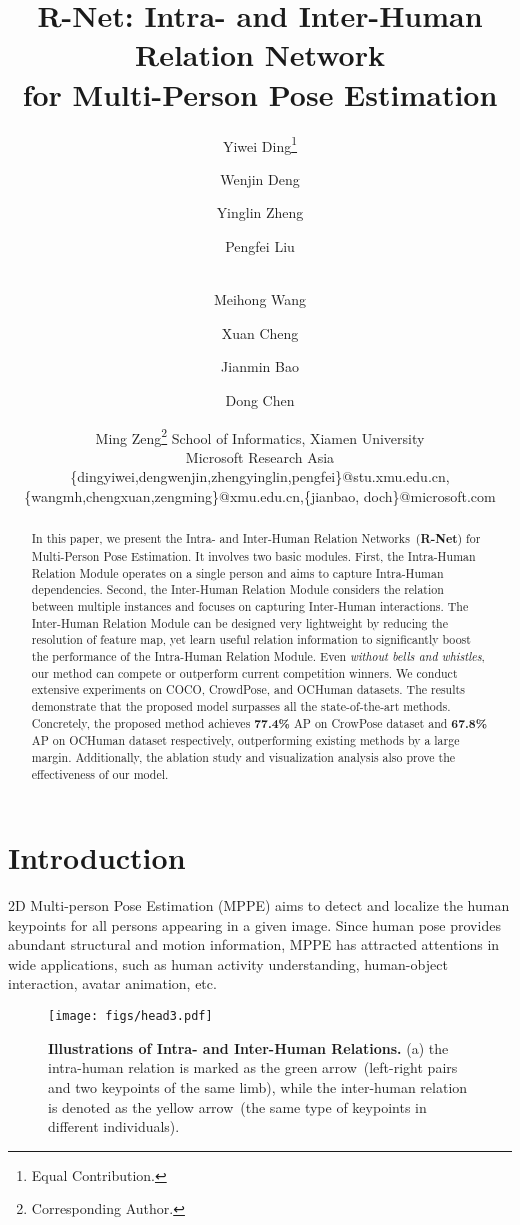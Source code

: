 \documentclass{article}
\title{R-Net: Intra- and Inter-Human Relation Network \\for Multi-Person Pose Estimation}
\author{
Yiwei Ding\thanks{Equal Contribution.}
\and
Wenjin Deng\and
Yinglin Zheng\and
Pengfei Liu\and\\
Meihong Wang\and
Xuan Cheng\and
Jianmin Bao\and
Dong Chen\and
Ming Zeng\thanks{Corresponding Author.}
\affiliations
School of Informatics, Xiamen University\\
Microsoft Research Asia \\
\emails
\{dingyiwei,dengwenjin,zhengyinglin,pengfei\}@stu.xmu.edu.cn,
\{wangmh,chengxuan,zengming\}@xmu.edu.cn,\{jianbao, doch\}@microsoft.com
}
\begin{document}
\maketitle

\begin{abstract}



In this paper, we present the Intra- and Inter-Human Relation Networks~(\textbf{R-Net}) for Multi-Person Pose Estimation. It involves two basic modules. First, the Intra-Human Relation Module operates on a single person and aims to capture Intra-Human dependencies. Second, the Inter-Human Relation Module considers the relation between multiple instances and focuses on capturing Inter-Human interactions. The Inter-Human Relation Module can be designed very lightweight by reducing the resolution of feature map, yet learn useful relation information to significantly boost the performance of the Intra-Human Relation Module.
Even \emph{without bells and whistles}, our method can compete or outperform current competition winners. We conduct extensive experiments on COCO, CrowdPose, and OCHuman datasets. The results demonstrate that the proposed model surpasses all the state-of-the-art methods. Concretely, the proposed method achieves \textbf{77.4\%} AP on CrowPose dataset and \textbf{67.8\%} AP on OCHuman dataset respectively, outperforming existing methods by a large margin. Additionally, the ablation study and visualization analysis also prove the effectiveness of our model.
  
\end{abstract}

\vspace{-3mm}
\section{Introduction}
2D Multi-person Pose Estimation (MPPE) aims to detect and localize the human keypoints for all persons appearing in a given image. Since human pose provides abundant structural and motion information, MPPE has attracted attentions in wide applications, such as human activity understanding, human-object interaction, avatar animation, etc. 



\begin{figure}[t]
 \centering
    \texttt{[image: figs/head3.pdf]}
    \vspace{-4mm}
  \caption{\textbf{Illustrations of Intra- and Inter-Human Relations.} 
  (a) the intra-human relation is marked as the green arrow~(left-right pairs and two keypoints of the same limb), while the inter-human relation is denoted as the yellow arrow~(the same type of keypoints in different individuals).} 
  \label{head}
  \vspace{-3mm}
\end{figure}
\end{document}
